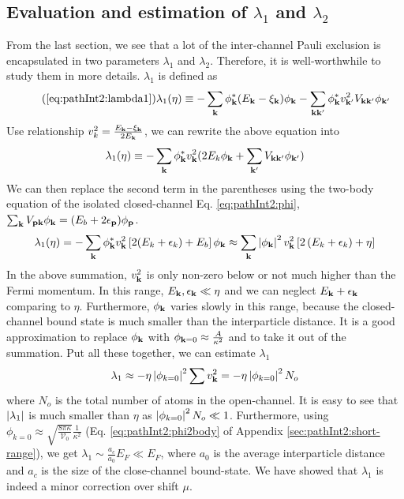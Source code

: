 \begin{unsure}
\subsection{Evaluation and estimation of $\lambda_{1}$ and $\lambda_{2}$\label{sec:pathInt2:lambda}}
From the last section, we  see  that a lot of the inter-channel Pauli exclusion is encapsulated in two parameters $\lambda_{1}$ and $\lambda_{2}$.   Therefore, it is well-worthwhile to study them in more details.  $\lambda_{1}$ is defined as 
\begin{equation}\tag{\ref{eq:pathInt2:lambda1}}
\lambda_{1}(\eta)\equiv-\sum_{\vk}{\phi_{\vk}^{*}}{(E_{\vk}-\xi_{\vk})}\phi_{\vk}
	-\sum_{\vk\vk'}{\phi_{\vk}^{*}}{v_{\vk'}^{2}V_{\vk\vk'}}\phi_{\vk'}
\end{equation}
Use relationship $v_{k}^{2}=\frac{E_{\mathbf{k}}-\xi_{\mathbf{k}}}{2E_{\mathbf{k}}}$, we can rewrite the above equation into 
\begin{equation}
\lambda_{1}(\eta)\equiv-\sum_{\mathbf{k}}{\phi_{\mathbf{k}}^{*}}v_{\mathbf{k}}^{2}(2E_{k}\phi_{\mathbf{k}}+\sum_{\mathbf{k}'}V_{\mathbf{k}\mathbf{k}'}\phi_{\mathbf{k}'})
\end{equation}
We can then replace the second term  in the parentheses using the two-body \sch equation of the isolated closed-channel Eq. \ref{eq:pathInt2:phi}, $\sum_{\mathbf{k}}V_{\mathbf{p}\mathbf{k}} \phi_{\mathbf{k}}=(E_{b}+2\epsilon_{\mathbf{p}})\phi_{\mathbf{p}}$.
\begin{equation*}
\lambda_{1}(\eta)=-\sum_{\mathbf{k}}{\phi_{\mathbf{k}}^{*}}v_{\mathbf{k}}^{2}\left[2(E_{k}+\epsilon_{k})+E_b\right]\phi_{\mathbf{k}}
	\approx\sum_{\mathbf{k}}\left\lvert{\phi_{\ensuremath{\mathbf{k}}}}\right\rvert^2v_{\mathbf{k}}^{2}\left[2\left(E_{k}+\epsilon_{k}\right)+\eta\right]
\end{equation*}
In the above summation, $v_{\mathbf{k}}^2$ is only non-zero below or not much higher than the Fermi momentum.  In this range, $E_{\mathbf{k}},\epsilon_{\mathbf{k}}\ll\eta$ and we can neglect $E_{\mathbf{k}}+\epsilon_{\mathbf{k}}$ comparing to $\eta$.  
Furthermore, $\phi_{\mathbf{k}}$ varies slowly  in this range, because the closed-channel bound state is much smaller than the interparticle distance.    It is a good approximation to replace $\phi_{\mathbf{k}}$ with $\phi_{\mathbf{k}=0}\approx\frac{A}{\kappa^{2}}$ and to take it out of the summation.  
Put all these together, we can estimate $\lambda_{1}$ 
\begin{equation}\label{eq:pathInt2:lambda1es}
\lambda_{1}\approx-\eta\left\lvert{\phi_{k=0}}\right\rvert^2\sum{}v_{\mathbf{k}}^{2}=-\eta\left\lvert{\phi_{k=0}}\right\rvert^2N_{o}	
\end{equation}
where $N_{o}$ is the total number of atoms in the open-channel. It is easy to see that $\left\lvert{\lambda_{1}}\right\rvert$ is much smaller than $\eta$ as $\left\lvert{\phi_{k=0}}\right\rvert^2N_{o}\ll1$.  Furthermore, using $\phi_{k=0}\approx\sqrt{\frac{8\pi\kappa}{\mathcal{V}_{0}}}\frac{1}{\kappa^{2}}$ (Eq. \ref{eq:pathInt2:phi2body} of Appendix \ref{sec:pathInt2:short-range}), we get $\lambda_{1}\sim\frac{a_{c}}{a_{0}}E_{F}\ll{}E_{F}$, where $a_{0}$ is the average interparticle distance and $a_{c}$ is the size of the close-channel bound-state.   We have showed that $\lambda_{1}$ is indeed a minor correction over shift $\mu$.

\end{unsure}
